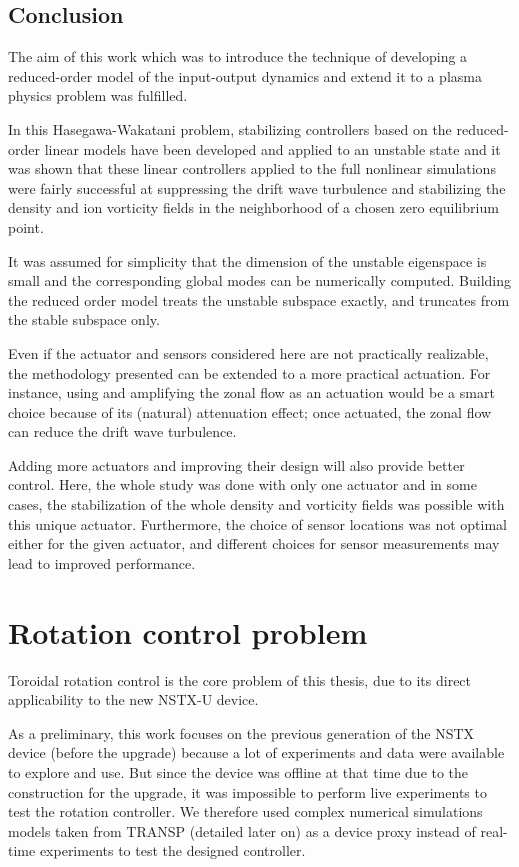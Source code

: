 \documentclass[12pt,lot, lof]{puthesis}
\begin{document}
\section{Conclusion}

The aim of this work which was to introduce the technique of developing a reduced-order model of the input-output dynamics  and extend it to a plasma physics problem was fulfilled. 

In this Hasegawa-Wakatani problem, stabilizing controllers based on the reduced-order linear models have been developed and applied to an unstable state and it was shown that these linear controllers applied to the full nonlinear simulations were fairly successful at suppressing the drift wave turbulence  and stabilizing the density and ion vorticity fields in the neighborhood of a chosen zero equilibrium point.

It was assumed for simplicity that the dimension of the unstable eigenspace is small and the corresponding global modes can be numerically computed. Building the reduced order model treats the unstable subspace exactly, and truncates from the stable subspace only.
 
Even if the actuator and sensors considered here are not practically realizable, the methodology presented can be extended to a more practical actuation. For instance, using and amplifying the zonal flow as an actuation would be a smart choice because of its (natural) attenuation effect; once actuated, the zonal flow can reduce the drift wave turbulence.

Adding more actuators and improving their design will also provide better control. Here, the whole study was done with only one actuator and in some cases, the stabilization of the whole density and vorticity fields was possible with this unique actuator.
Furthermore, the choice of sensor locations was not optimal either for the given actuator, and different choices for sensor measurements may lead to improved performance. 



\chapter{Rotation control problem}

Toroidal rotation control is the core problem of this thesis, due to its direct applicability to the new NSTX-U device.

As a preliminary, this work focuses on the previous generation of the NSTX device (before the upgrade) because a lot of experiments and data were available to explore and use.
But since the device was offline at that time due to the construction for the upgrade, it was impossible to perform live experiments to test the rotation controller.
We therefore used complex numerical simulations models taken from TRANSP (detailed later on) as a device proxy instead of real-time experiments to test the designed controller.
\end{document}
